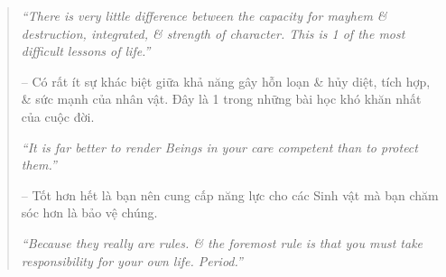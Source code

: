 \documentclass{article}
\begin{document}
\begin{enumerate}
\begin{quotation}
		{\it``There is very little difference between the capacity for mayhem \& destruction, integrated, \& strength of character. This is 1 of the most difficult lessons of life.''}
		
		-- Có rất ít sự khác biệt giữa khả năng gây hỗn loạn \& hủy diệt, tích hợp, \& sức mạnh của nhân vật. Đây là 1 trong những bài học khó khăn nhất của cuộc đời.
		
		{\it``It is far better to render Beings in your care competent than to protect them.''}
		
		-- Tốt hơn hết là bạn nên cung cấp năng lực cho các Sinh vật mà bạn chăm sóc hơn là bảo vệ chúng.
		
		{\it``Because they really are rules. \& the foremost rule is that you must take responsibility for your own life. Period.''}
		

\end{quotation}
\end{enumerate}
\end{document}
